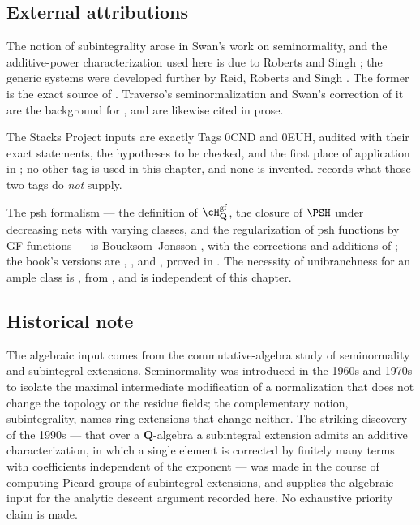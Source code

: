 \subsection{External attributions}
\label{sec:ch44-external}

The notion of subintegrality arose in Swan's work on seminormality, and the
additive-power characterization used here is due to Roberts and Singh
\cite{RobertsSingh}; the generic systems were developed further by Reid,
Roberts and Singh \cite{ReidRobertsSingh1995}.  The former is the exact
source of .  Traverso's seminormalization and
Swan's correction of it are the background for
, and are likewise cited in prose.

The Stacks Project inputs are exactly Tags 0CND and 0EUH, audited with their
exact statements, the hypotheses to be checked, and the first place of
application in ; no other tag is
used in this chapter, and none is invented.
 records what those two tags do \emph{not}
supply.

The psh formalism --- the definition of
$\cH^{\mathrm{gf}}_{\mathbf Q}$, the closure of $\PSH$ under decreasing
nets with varying classes, and the regularization of psh functions by GF
functions --- is Boucksom--Jonsson \cite{BJ22}, with the corrections and
additions of \cite{BJ22b}; the book's versions are
, ,
 and , proved in
.  The necessity of unibranchness for an ample class
is , from
, and is independent of this chapter.

\subsection{Historical note}
\label{sec:ch44-historical}

The algebraic input comes from the commutative-algebra study of
seminormality and subintegral extensions.  Seminormality was introduced in
the 1960s and 1970s to isolate the maximal intermediate modification of a
normalization that does not change the topology or the residue fields; the
complementary notion, subintegrality, names ring extensions that change
neither.  The
striking discovery of the 1990s --- that over a $\mathbf Q$-algebra a
subintegral extension admits an additive characterization, in which a single
element is corrected by finitely many terms with coefficients independent of
the exponent --- was made in the course of computing Picard groups of
subintegral extensions, and supplies the algebraic input for the analytic descent argument
recorded here.  No exhaustive priority claim is made.

